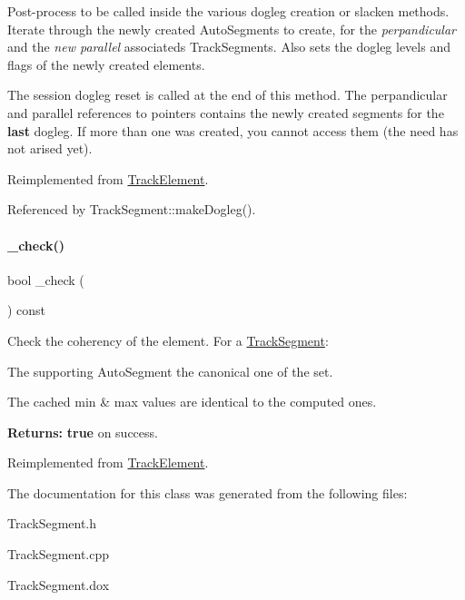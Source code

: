 Post-\/process to be called inside the various dogleg creation or slacken methods. Iterate through the newly created Auto\+Segments to create, for the {\itshape perpandicular} and the {\itshape new parallel} associateds Track\+Segments. Also sets the dogleg levels and flags of the newly created elements.

The session dogleg reset is called at the end of this method. The {\ttfamily perpandicular} and {\ttfamily parallel} references to pointers contains the newly created segments for the {\bfseries last} dogleg. If more than one was created, you cannot access them (the need has not arised yet). 

Reimplemented from \mbox{\hyperlink{classKite_1_1TrackElement}{Track\+Element}}.



Referenced by Track\+Segment\+::make\+Dogleg().

\mbox{\label{classKite_1_1TrackSegment_ad79f4c6ea0fe1135b8264a29af085909}} 
\paragraph{\texorpdfstring{\+\_\+check()}{\_check()}}
{\footnotesize\ttfamily bool \+\_\+check (\begin{DoxyParamCaption}{ }\end{DoxyParamCaption}) const\hspace{0.3cm}{\ttfamily [virtual]}}

Check the coherency of the element. For a \mbox{\hyperlink{classKite_1_1TrackSegment}{Track\+Segment}}\+:
\begin{DoxyItemize}
\item The supporting Auto\+Segment the canonical one of the set.
\item The cached {\ttfamily min} \& {\ttfamily max} values are identical to the computed ones.
\end{DoxyItemize}

{\bfseries Returns\+:} {\bfseries true} on success. 

Reimplemented from \mbox{\hyperlink{classKite_1_1TrackElement_ad79f4c6ea0fe1135b8264a29af085909}{Track\+Element}}.



The documentation for this class was generated from the following files\+:\begin{DoxyCompactItemize}
\item 
Track\+Segment.\+h\item 
Track\+Segment.\+cpp\item 
Track\+Segment.\+dox\end{DoxyCompactItemize}
